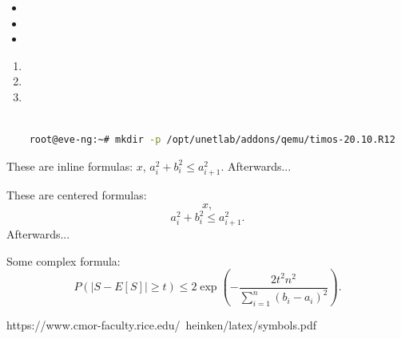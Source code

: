 





\begin{itemize}
    \item 
    \item 
    \item 
\end{itemize}


\begin{enumerate}
    \item 
    \item 
    \item 
\end{enumerate}






    \lstset{style=mystyle} %
    
    \begin{lstlisting}[language=bash, caption= code caption]
    
    root@eve-ng:~# mkdir -p /opt/unetlab/addons/qemu/timos-20.10.R12

    \end{lstlisting}





These are inline formulas: $x$, $a_i^2 + b_i^2 \le a_{i+1}^2$. Afterwards...

These are centered formulas: $$x,$$ $$a_i^2 + b_i^2 \le a_{i+1}^2.$$ Afterwards...

Some complex formula: $$P(|S - E[S]| \ge t) \le 2 \exp \left( -\frac{2 t^2 n^2}{\sum_{i = 1}^n (b_i - a_i)^2} \right).$$


https://www.cmor-faculty.rice.edu/~heinken/latex/symbols.pdf